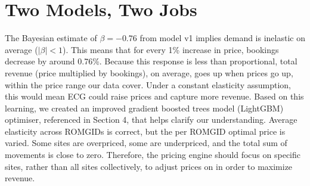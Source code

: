 \documentclass[11pt,a4paper]{article}
\begin{document}
\begin{center}
\end{center}

\section{Two Models, Two Jobs}

The Bayesian estimate of $\beta = -0.76$ from model v1 implies demand is inelastic on average ($|\beta| < 1$). This means that for every 1\% increase in price, bookings decrease by around 0.76\%. Because this response is less than proportional, total revenue (price multiplied by bookings), on average, goes up when prices go up, within the price range our data cover. Under a constant elasticity assumption, this would mean ECG could raise prices and capture more revenue. Based on this learning, we created an improved gradient boosted trees model (LightGBM) optimiser, referenced in Section 4, that helps clarify our understanding. Average elasticity across ROMGIDs is correct, but the per ROMGID optimal price is varied. Some sites are overpriced, some are underpriced, and the total sum of movements is close to zero. Therefore, the pricing engine should focus on specific sites, rather than all sites collectively, to adjust prices on in order to maximize revenue.
\end{document}
